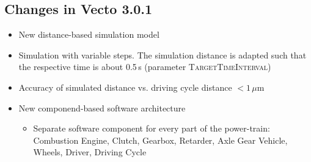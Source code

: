 \subsection{Changes in Vecto 3.0.1} %
\label{ssub:changes_in_vecto_3_0_1}

\begin{itemize}
	\item New distance-based simulation model
	\item Simulation with variable steps. The simulation distance is adapted such that the respective time is about 0.5\,s (parameter \textsc{TargetTimeInterval})
	\item Accuracy of simulated distance vs. driving cycle distance $< 1\,\mu\textrm{m}$
	\item New componend-based software architecture
	\begin{itemize}
		\item Separate software component for every part of the power-train:
		Combustion Engine,
		Clutch,
		Gearbox,
		Retarder,
		Axle Gear
		Vehicle,
		Wheels,
		Driver,
		Driving Cycle


\end{itemize}
\end{itemize}
